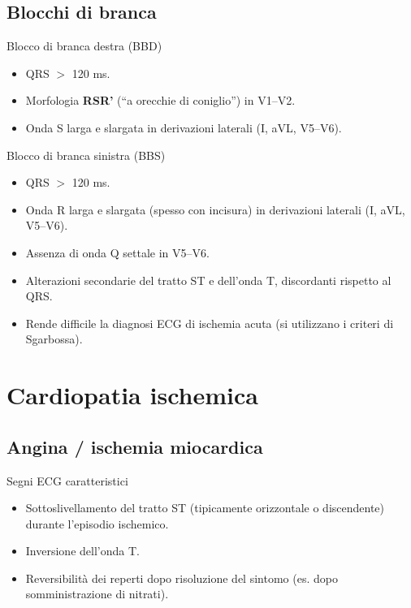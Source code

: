 \documentclass[11pt,a4paper]{article}
\begin{document}
\subsection{Blocchi di branca}

\begin{keybox}{Blocco di branca destra (BBD)}
\begin{itemize}[leftmargin=1.2em]
  \item QRS $>$ 120 ms.
  \item Morfologia \textbf{RSR'} (“a orecchie di coniglio”) in V1--V2.
  \item Onda S larga e slargata in derivazioni laterali (I, aVL, V5--V6).
\end{itemize}
\end{keybox}

\begin{keybox}{Blocco di branca sinistra (BBS)}
\begin{itemize}[leftmargin=1.2em]
  \item QRS $>$ 120 ms.
  \item Onda R larga e slargata (spesso con incisura) in derivazioni laterali (I, aVL, V5--V6).
  \item Assenza di onda Q settale in V5--V6.
  \item Alterazioni secondarie del tratto ST e dell'onda T, discordanti rispetto al QRS.
  \item Rende difficile la diagnosi ECG di ischemia acuta (si utilizzano i criteri di Sgarbossa).
\end{itemize}
\end{keybox}

\section{Cardiopatia ischemica}

\subsection{Angina / ischemia miocardica}
\begin{keybox}{Segni ECG caratteristici}
\begin{itemize}[leftmargin=1.2em]
  \item Sottoslivellamento del tratto ST (tipicamente orizzontale o discendente) durante l'episodio ischemico.
  \item Inversione dell'onda T.
  \item Reversibilità dei reperti dopo risoluzione del sintomo (es. dopo somministrazione di nitrati).
\end{itemize}
\end{keybox}
\end{document}
